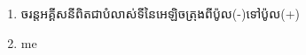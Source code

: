 \documentclass{article}
\author{james1}
\date{\today}
\begin{document}
\begin{enumerate}
\item \kfont ចរន្តអគ្គីសនីពិតជាបំលាស់ទីនៃអេឡិចត្រុងពីប៉ូល(-)ទៅប៉ូល(+)
\item me
\end{enumerate}
\end{document}
